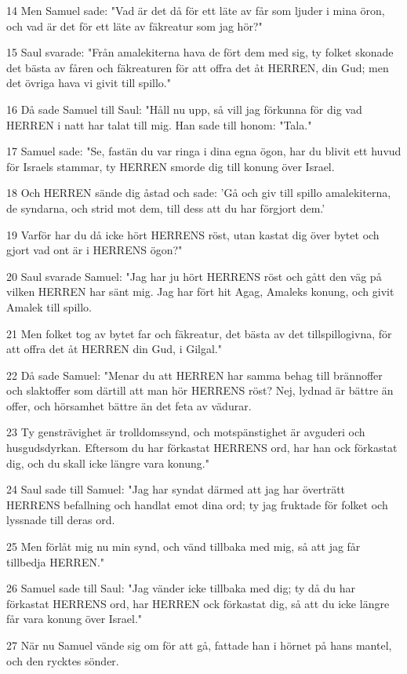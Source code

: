 \par 14 Men Samuel sade: "Vad är det då för ett läte av får som ljuder i mina öron, och vad är det för ett läte av fäkreatur som jag hör?"
\par 15 Saul svarade: "Från amalekiterna hava de fört dem med sig, ty folket skonade det bästa av fåren och fäkreaturen för att offra det åt HERREN, din Gud; men det övriga hava vi givit till spillo."
\par 16 Då sade Samuel till Saul: "Håll nu upp, så vill jag förkunna för dig vad HERREN i natt har talat till mig. Han sade till honom: "Tala."
\par 17 Samuel sade: "Se, fastän du var ringa i dina egna ögon, har du blivit ett huvud för Israels stammar, ty HERREN smorde dig till konung över Israel.
\par 18 Och HERREN sände dig åstad och sade: 'Gå och giv till spillo amalekiterna, de syndarna, och strid mot dem, till dess att du har förgjort dem.'
\par 19 Varför har du då icke hört HERRENS röst, utan kastat dig över bytet och gjort vad ont är i HERRENS ögon?"
\par 20 Saul svarade Samuel: "Jag har ju hört HERRENS röst och gått den väg på vilken HERREN har sänt mig. Jag har fört hit Agag, Amaleks konung, och givit Amalek till spillo.
\par 21 Men folket tog av bytet far och fäkreatur, det bästa av det tillspillogivna, för att offra det åt HERREN din Gud, i Gilgal."
\par 22 Då sade Samuel: "Menar du att HERREN har samma behag till brännoffer och slaktoffer som därtill att man hör HERRENS röst? Nej, lydnad är bättre än offer, och hörsamhet bättre än det feta av vädurar.
\par 23 Ty gensträvighet är trolldomssynd, och motspänstighet är avguderi och husgudsdyrkan. Eftersom du har förkastat HERRENS ord, har han ock förkastat dig, och du skall icke längre vara konung."
\par 24 Saul sade till Samuel: "Jag har syndat därmed att jag har överträtt HERRENS befallning och handlat emot dina ord; ty jag fruktade för folket och lyssnade till deras ord.
\par 25 Men förlåt mig nu min synd, och vänd tillbaka med mig, så att jag får tillbedja HERREN."
\par 26 Samuel sade till Saul: "Jag vänder icke tillbaka med dig; ty då du har förkastat HERRENS ord, har HERREN ock förkastat dig, så att du icke längre får vara konung över Israel."
\par 27 När nu Samuel vände sig om för att gå, fattade han i hörnet på hans mantel, och den rycktes sönder.
